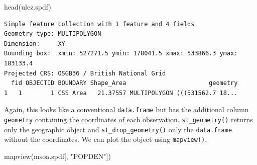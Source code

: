 \documentclass[
  letterpaper,
]{scrbook}
\newenvironment{Shaded}{\begin{snugshade}}{\end{snugshade}}
\newcommand{\FunctionTok}[1]{\textcolor[rgb]{0.28,0.35,0.67}{#1}}
\newcommand{\NormalTok}[1]{\textcolor[rgb]{0.00,0.23,0.31}{#1}}
\newcommand{\StringTok}[1]{\textcolor[rgb]{0.13,0.47,0.30}{#1}}
\begin{document}
\begin{Shaded}
\begin{Highlighting}[]
\FunctionTok{head}\NormalTok{(ulez.spdf)}
\end{Highlighting}
\end{Shaded}

\begin{verbatim}
Simple feature collection with 1 feature and 4 fields
Geometry type: MULTIPOLYGON
Dimension:     XY
Bounding box:  xmin: 527271.5 ymin: 178041.5 xmax: 533866.3 ymax: 183133.4
Projected CRS: OSGB36 / British National Grid
  fid OBJECTID BOUNDARY Shape_Area                       geometry
1   1        1 CSS Area   21.37557 MULTIPOLYGON (((531562.7 18...
\end{verbatim}

Again, this looks like a conventional \texttt{data.frame} but has the
additional column \texttt{geometry} containing the coordinates of each
observation. \texttt{st\_geometry()} returns only the geographic object
and \texttt{st\_drop\_geometry()} only the \texttt{data.frame} without
the coordinates. We can plot the object using \texttt{mapview()}.

\begin{Shaded}
\begin{Highlighting}[]
\FunctionTok{mapview}\NormalTok{(msoa.spdf[, }\StringTok{"POPDEN"}\NormalTok{])}
\end{Highlighting}
\end{Shaded}
\end{document}

